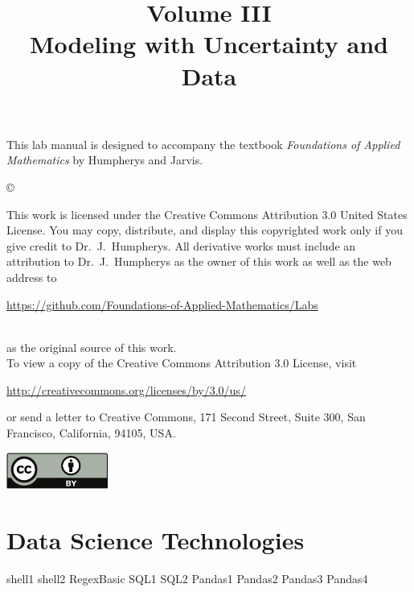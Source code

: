 \documentclass[opener-c,labs,yellow,nociteref]{HJnewsiambook}
\title{Volume III\\ Modeling with Uncertainty and Data}
\begin{document}

\thispagestyle{empty} %
\maketitle
\thispagestyle{empty}
\frontmatter


\begin{thepreface} %

This lab manual is designed to accompany the textbook \emph{Foundations of Applied Mathematics} by Humpherys and Jarvis.

\vfill
\copyright{This work is licensed under the Creative Commons Attribution 3.0 United States License.
You may copy, distribute, and display this copyrighted work only if you give credit to Dr.~J.~Humpherys.
All derivative works must include an attribution to Dr.~J.~Humpherys as the owner of this work as well as the web address to
\\\centerline{\url{https://github.com/Foundations-of-Applied-Mathematics/Labs}}\\as the original source of this work.
\\To view a copy of the Creative Commons Attribution 3.0 License, visit
\\\centerline{\url{http://creativecommons.org/licenses/by/3.0/us/}} or send a letter to Creative Commons, 171 Second Street, Suite 300, San Francisco, California, 94105, USA.}

\vfill
\centering\includegraphics[height=1.2cm]{by.pdf}
\vfill
\end{thepreface}

\setcounter{tocdepth}{1}
\tableofcontents

\mainmatter %

\part{Data Science Technologies} %
{shell1}
{shell2}
{RegexBasic}
{SQL1}
{SQL2}
{Pandas1}
{Pandas2}
{Pandas3}
{Pandas4}
\end{document}

